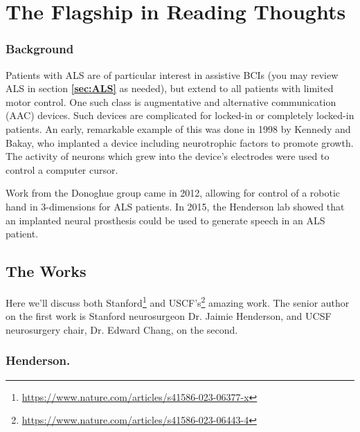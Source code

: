 \section{The Flagship in Reading Thoughts}

\subsubsection{Background}

Patients with ALS are of particular interest in assistive BCIs (you may review ALS in section \textbf{\ref{sec:ALS}} as needed), but extend to all patients with limited motor control. One such class is augmentative and alternative communication (AAC) devices. Such devices are complicated for locked-in or completely locked-in patients. An early, remarkable example of this was done in 1998 by Kennedy and Bakay, who implanted a device including neurotrophic factors to promote growth. The activity of neurons which grew into the device's electrodes were used to control a computer cursor.\newline

Work from the Donoghue group came in 2012, allowing for control of a robotic hand in 3-dimensions for ALS patients. In 2015, the Henderson lab showed that an implanted neural prosthesis could be used to generate speech in an ALS patient. 

\subsection{The Works}

Here we'll discuss both Stanford\footnote{\url{https://www.nature.com/articles/s41586-023-06377-x}} and USCF's\footnote{\url{https://www.nature.com/articles/s41586-023-06443-4}} amazing work. The senior author on the first work is Stanford neurosurgeon Dr. Jaimie Henderson, and UCSF neurosurgery chair, Dr. Edward Chang, on the second. 

\subsubsection{Henderson.}


